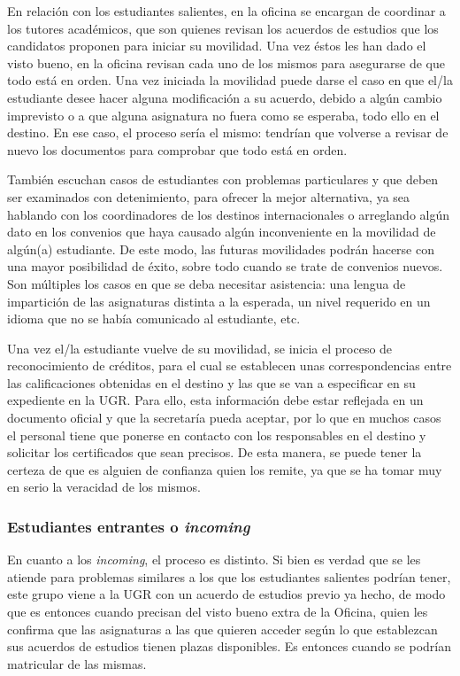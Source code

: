 En relación con los estudiantes salientes, en la oficina se encargan de coordinar a los tutores académicos, que son quienes revisan los acuerdos de estudios que los candidatos proponen para iniciar su movilidad. Una vez éstos les han dado el visto bueno, en la oficina revisan cada uno de los mismos para asegurarse de que todo está en orden. Una vez iniciada la movilidad puede darse el caso en que el/la estudiante desee hacer alguna modificación a su acuerdo, debido a algún cambio imprevisto o a que alguna asignatura no fuera como se esperaba, todo ello en el destino. En ese caso, el proceso sería el mismo: tendrían que volverse a revisar de nuevo los documentos para comprobar que todo está en orden.

También escuchan casos de estudiantes con problemas particulares y que deben ser examinados con detenimiento, para ofrecer la mejor alternativa, ya sea hablando con los coordinadores de los destinos internacionales o arreglando algún dato en los convenios que haya causado algún inconveniente en la movilidad de algún(a) estudiante. De este modo, las futuras movilidades podrán hacerse con una mayor posibilidad de éxito, sobre todo cuando se trate de convenios nuevos. Son múltiples los casos en que se deba necesitar asistencia: una lengua de impartición de las asignaturas distinta a la esperada, un nivel requerido en un idioma que no se había comunicado al estudiante, etc.

Una vez el/la estudiante vuelve de su movilidad, se inicia el proceso de reconocimiento de créditos, para el cual se establecen unas correspondencias entre las calificaciones obtenidas en el destino y las que se van a especificar en su expediente en la UGR. Para ello, esta información debe estar reflejada en un documento oficial y que la secretaría pueda aceptar, por lo que en muchos casos el personal tiene que ponerse en contacto con los responsables en el destino y solicitar los certificados que sean precisos. De esta manera, se puede tener la certeza de que es alguien de confianza quien los remite, ya que se ha tomar muy en serio la veracidad de los mismos.

\subsubsection{Estudiantes entrantes o \textit{incoming}}

En cuanto a los \textit{incoming}, el proceso es distinto. Si bien es verdad que se les atiende para problemas similares a los que los estudiantes salientes podrían tener, este grupo viene a la UGR con un acuerdo de estudios previo ya hecho, de modo que es entonces cuando precisan del visto bueno extra de la Oficina, quien les confirma que las asignaturas a las que quieren acceder según lo que establezcan sus acuerdos de estudios tienen plazas disponibles. Es entonces cuando se podrían matricular de las mismas.


